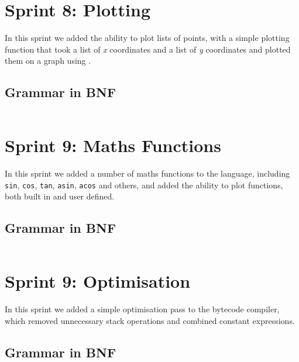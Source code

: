\begin{verbatim}
\end{verbatim}

\section{Sprint 8: Plotting}\label{sec:plotting1}

In this sprint we added the ability to plot lists of points, with a simple plotting function that took a list of
\textit{x} coordinates and a list of \textit{y} coordinates and plotted them on a graph using \citet{scottPlot}.

\subsection{Grammar in BNF}\label{subsec:grammar-in-bnf8}

\begin{verbatim}
\end{verbatim}

\section{Sprint 9: Maths Functions}\label{sec:maths-funcs}

In this sprint we added a number of maths functions to the language, including \texttt{sin}, \texttt{cos}, \texttt{tan},
\texttt{asin}, \texttt{acos} and others, and added the ability to plot functions, both built in and user defined.

\subsection{Grammar in BNF}\label{subsec:grammar-in-bnf9}

\begin{verbatim}
\end{verbatim}

\section{Sprint 9: Optimisation}\label{sec:optimisation1}

In this sprint we added a simple optimisation pass to the bytecode compiler, which removed unnecessary stack operations
and combined constant expressions.

\subsection{Grammar in BNF}\label{subsec:grammar-in-bnf10}

\begin{verbatim}
\end{verbatim}